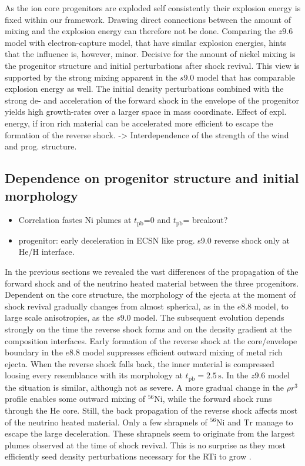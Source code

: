 \documentclass[fleqn,usenatbib]{mnras}
\newcommand{\tpb}{\ensuremath{t_{\text{pb}}}}
\newcommand{\nickel}{\ensuremath{\mathrm{^{56}Ni}}\xspace}
\newcommand{\tracer}{\ensuremath{\mathrm{Tr}}\xspace}
\newcommand{\s}{\ensuremath{\text{s}}}
\newcommand{\COM}[1]{{\color{orange}#1}}
\begin{document}
As the ion core progenitors are exploded self consistently their explosion energy is fixed within our framework. Drawing direct connections between the amount of mixing and the explosion energy can therefore not be done. Comparing the $z9.6$ model with electron-capture model, that have similar explosion energies, hints that the influence is, however, minor. Decisive for the amount of nickel mixing is the progenitor structure and initial perturbations after shock revival. This view is supported by the strong mixing apparent in the $s9.0$ model that has comparable explosion energy as well. The initial density perturbations combined with the strong de- and acceleration of the forward shock in the envelope of the progenitor yields high growth-rates over a larger space in mass coordinate. 
\COM{Effect of expl. energy, if iron rich material can be accelerated more efficient to escape the formation of the reverse shock. -> Interdependence of the strength of the wind and prog. structure. }

\subsection{Dependence on progenitor structure and initial morphology}
\COM{
\begin{itemize}
    \item Correlation fastes Ni plumes at \tpb=0 and \tpb= breakout?
    \item progenitor: early deceleration in ECSN like prog. s9.0 reverse shock only at He/H interface. 
\end{itemize}
}
In the previous sections we revealed the vast differences of the propagation of the forward shock and of the neutrino heated material between the three progenitors. 
Dependent on the core structure, the morphology of the ejecta at the moment of shock revival gradually changes from  almost spherical, as in the $e8.8$ model, to large scale anisotropies, as the $s9.0$ model.
The subsequent evolution depends strongly on the time the reverse shock forms and on the density gradient at the composition interfaces.
Early formation of the reverse shock at the core/envelope boundary in the $e8.8$ model suppresses efficient outward mixing of metal rich ejecta. When the reverse shock falls back, the inner material is compressed loosing every resemblance with its morphology at $\tpb=2.5\,\s$.
In the $z9.6$ model the situation is similar, although not as severe. A more gradual change in the $\rho r^3$ profile enables some outward mixing of \nickel, while the forward shock runs through the He core. Still, the back propagation of the reverse shock affects most of the neutrino heated material. Only a few shrapnels of \nickel and \tracer manage to escape the large deceleration. These shrapnels seem to originate from the largest plumes observed at the time of shock revival. This is no surprise as they most efficiently seed density perturbations necessary for the RTi to grow \citep{Wongwathanarat2015}.
\end{document}
